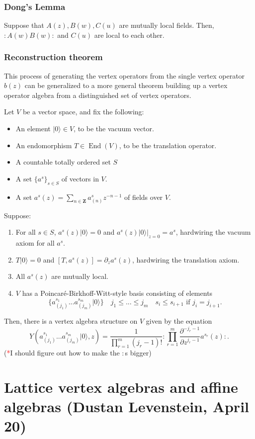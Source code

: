 \documentclass{article}
\newcommand{\ZZ}{\mathbold{Z}}
\newcommand{\vac}{|0\rangle}
\newcommand{\normord}[1]{:\mathrel{#1}:}
\newcommand{\tk}{\textcolor{red}{*}}
\DeclareMathOperator{\End}{End}
\begin{document}
\subsubsection{Dong's Lemma}
Suppose that $A(z),B(w),C(u)$ are mutually local fields.  Then, $\normord{A(w)B(w)}$ and $C(u)$ are local to each other.
\subsubsection{Reconstruction theorem}
\label{sec:recthm}
This process of generating the vertex operators from the single vertex operator $b(z)$ can be generalized to a more general theorem building up a vertex operator algebra from a distinguished set of vertex operators.

Let $V$ be a vector space, and fix the following:
\begin{itemize}
\item An element $\vac \in V$, to be the vacuum vector.
\item An endomorphism $T \in \End(V)$, to be the translation operator.
\item A countable totally ordered set $S$
\item A set $\{a^s\}_{s \in S}$ of vectors in $V$.
\item A set $a^s(z)=\sum_{n \in \ZZ}a^s_{(n)}z^{-n-1}$ of fields over $V$.
\end{itemize}
Suppose:
\begin{enumerate}
\item For all $s \in S$, $a^s(z)\vac=0$ and $a^s(z)\vac|_{z=0}=a^s$, hardwiring the vacuum axiom for all $a^s$.
\item $T\vac=0$ and $[T,a^s(z)]=\partial_za^s(z)$, hardwiring the translation axiom.
\item All $a^s(z)$ are mutually local.
\item $V$ has a Poincaré-Birkhoff-Witt-style basis consisting of elements
\[
  \{a^{s_1}_{(j_1)}...a^{s_m}_{(j_m)}\vac\}\quad
  j_1 \le ... \le j_m\quad
  s_i \le s_{i+1}\textrm{ if }j_i=j_{i+1}.
\]
\end{enumerate}
Then, there is a vertex algebra structure on $V$ given by the equation
\[
  Y(a^{s_1}_{(j_1)}...a^{s_m}_{(j_m)}\vac,z)=\frac{1}{\prod_{r=1}^m(j_r-1)!} \normord{\prod_{r=1}^m \frac{\partial^{-j_r-1}}{\partial z^{j_r-1}}a^{s_r}(z)}.
\]
(\tk I should figure out how to make the $:$s bigger)

\section{Lattice vertex algebras and affine algebras (Dustan Levenstein, April 20)}
\label{sec:latticeaffine}
\end{document}
